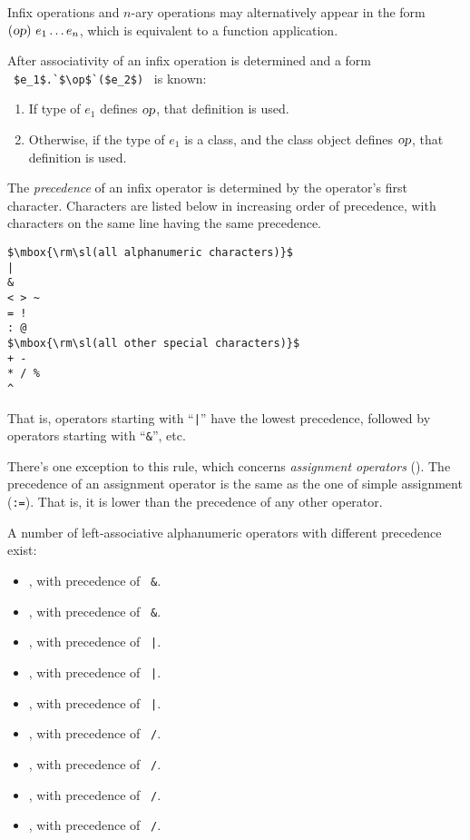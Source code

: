 Infix operations and $n$-ary operations may alternatively appear in the form $(\mbox{\sl op})\ e_1 \ldots e_n$, which is equivalent to a function application. 

After associativity of an infix operation is determined and a form ~\lstinline!$e_1$.`$\op$`($e_2$)!~ is known:
\begin{enumerate}
  \item If type of $e_1$ defines $\mbox{\sl op}$, that definition is used. 
  \item Otherwise, if the type of $e_1$ is a class, and the class object defines $\mbox{\sl op}$, that definition is used. 
\end{enumerate}

The {\em precedence} of an infix operator is determined by the operator's first character. Characters are listed below in increasing order of precedence, with characters on the same line having the same precedence.

\begin{lstlisting}
$\mbox{\rm\sl(all alphanumeric characters)}$
|
&
< > ~
= !
: @
$\mbox{\rm\sl(all other special characters)}$
+ -
* / %
^
\end{lstlisting}

That is, operators starting with ``\lstinline!|!'' have the lowest precedence, followed by operators starting with ``\lstinline!&!'', etc. 

There's one exception to this rule, which concerns {\em assignment operators} (). The precedence of an assignment operator is the same as the one of simple assignment (\lstinline!:=!). That is, it is lower than the precedence of any other operator. 

A number of left-associative alphanumeric operators with different precedence exist:
\begin{itemize}
  \item {}, with precedence of ~\lstinline!&!. 
  \item {}, with precedence of ~\lstinline!&!. 
  \item {}, with precedence of ~\lstinline!|!.  
  \item {}, with precedence of ~\lstinline!|!.  
  \item {}, with precedence of ~\lstinline!|!.  
  \item {}, with precedence of ~\lstinline!/!. 
  \item {}, with precedence of ~\lstinline!/!. 
  \item {}, with precedence of ~\lstinline!/!. 
  \item {}, with precedence of ~\lstinline!/!.   
\end{itemize}

